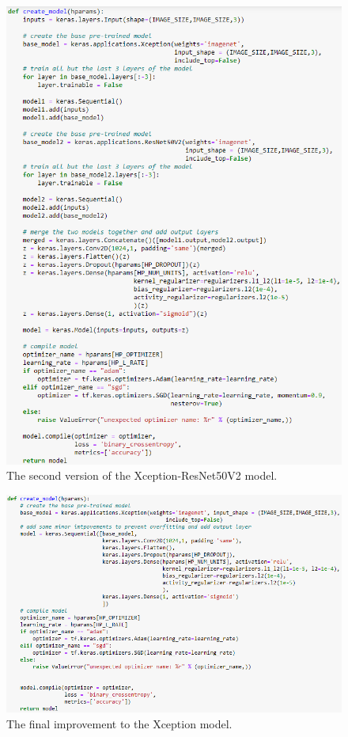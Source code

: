 \begin{figure}[H]
    \centering
    \includegraphics[width=\textwidth]{figures/xception-improvement-4.png}
    \caption{The second version of the Xception-ResNet50V2 model.}
    \label{fig:xception-improvement-4}
\end{figure}
\begin{figure}[H]
    \centering
    \includegraphics[width=\textwidth]{figures/xception-improvement-5.png}
    \caption{The final improvement to the Xception model.}
    \label{fig:xception-improvement-5}
\end{figure}
